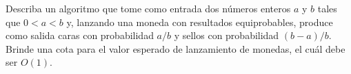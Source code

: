 \begin{statement}{3}
  Describa un algoritmo que tome como entrada dos n\'umeros enteros $a$ y $b$ tales que
  $0 < a < b$ y, lanzando una moneda con resultados equiprobables, produce como salida
  caras con probabilidad $a / b$ y sellos con probabilidad $(b - a) / b$.
  Brinde una cota para el valor esperado de lanzamiento de monedas, el cu\'al debe ser $O(1)$.
\end{statement}